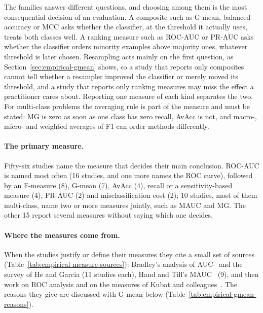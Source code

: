 The families answer different questions, and choosing among them is the most consequential decision of an evaluation. A composite such as G-mean, balanced accuracy or MCC asks whether the classifier, at the threshold it actually uses, treats both classes well. A ranking measure such as ROC-AUC or PR-AUC asks whether the classifier orders minority examples above majority ones, whatever threshold is later chosen. Resampling acts mainly on the first question, as Section~\ref{sec:empirical-gmean} shows, so a study that reports only composites cannot tell whether a resampler improved the classifier or merely moved its threshold, and a study that reports only ranking measures may miss the effect a practitioner cares about. Reporting one measure of each kind separates the two. For multi-class problems the averaging rule is part of the measure and must be stated: MG is zero as soon as one class has zero recall, AvAcc is not, and macro-, micro- and weighted averages of F1 can order methods differently.

\paragraph{The primary measure.} Fifty-six studies name the measure that decides their main conclusion. ROC-AUC is named most often (16 studies, and one more names the ROC curve), followed by an F-measure (8), G-mean (7), AvAcc (4), recall or a sensitivity-based measure (4), PR-AUC (2) and misclassification cost (2); 10 studies, most of them multi-class, name two or more measures jointly, such as MAUC and MG. The other 15 report several measures without saying which one decides.

\paragraph{Where the measures come from.} When the studies justify or define their measures they cite a small set of sources (Table~\ref{tab:empirical-measure-sources}): Bradley's analysis of AUC~\parencite{bradley1997use} and the survey of He and Garcia (11 studies each), Hand and Till's MAUC~\parencite{hand2001simple} (9), and then work on ROC analysis and on the measures of Kubat and colleagues~\parencite{kubat1997oss}. The reasons they give are discussed with G-mean below (Table~\ref{tab:empirical-gmean-reasons}).



